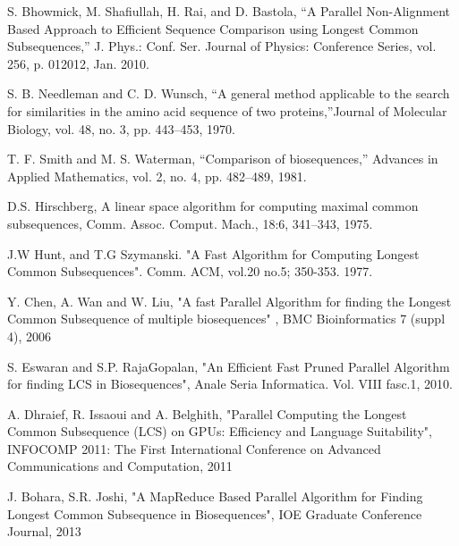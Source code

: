 \documentclass[journal,twoside]{IEEEtran}
\begin{document}
\begin{thebibliography}{9}

S. Bhowmick, M. Shafiullah, H. Rai, and D. Bastola, “A Parallel Non-Alignment Based Approach to Efficient Sequence Comparison using Longest Common Subsequences,” J. Phys.: Conf. Ser. Journal of Physics: Conference Series, vol. 256, p. 012012, Jan. 2010.

S. B. Needleman and C. D. Wunsch, “A general method applicable to the search for similarities in the amino acid sequence of two proteins,”Journal of Molecular Biology, vol. 48, no. 3, pp. 443–453, 1970.

T. F. Smith and M. S. Waterman, “Comparison of biosequences,” Advances in Applied Mathematics, vol. 2, no. 4, pp. 482–489, 1981.

D.S. Hirschberg, A linear space algorithm for computing maximal common subsequences, Comm. Assoc. Comput. Mach., 18:6, 341–343, 1975.

J.W Hunt, and T.G Szymanski. "A Fast Algorithm for Computing Longest Common Subsequences". Comm. ACM, vol.20 no.5; 350-353. 1977.

Y. Chen, A. Wan and W. Liu, "A fast Parallel Algorithm for finding the Longest Common Subsequence of multiple biosequences" , BMC Bioinformatics 7 (suppl 4), 2006

S. Eswaran and S.P. RajaGopalan, "An Efficient Fast Pruned Parallel Algorithm for finding LCS in Biosequences", Anale Seria Informatica. Vol. VIII fasc.1, 2010.

A. Dhraief, R. Issaoui and A. Belghith, "Parallel Computing the Longest Common Subsequence (LCS) on GPUs: Efficiency and Language Suitability", INFOCOMP 2011: The First International Conference on Advanced Communications and Computation, 2011

J. Bohara, S.R. Joshi, "A MapReduce Based Parallel Algorithm for Finding Longest Common Subsequence in Biosequences", IOE Graduate Conference Journal, 2013

\end{thebibliography}


\end{document}
